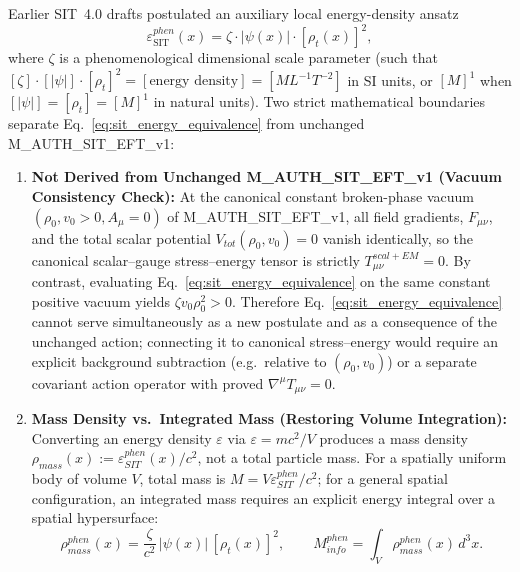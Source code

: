 \documentclass[american,11pt,letterpaper]{article}
\def\mathcal#1{#1}%
\def\mathrm#1{#1}%
\def\texttt#1{#1}%
\def\emph#1{#1}%
\begin{document}
Earlier SIT~4.0 drafts postulated an auxiliary local energy-density ansatz
\begin{equation}
    \varepsilon_{\text{SIT}}^{\mathrm{phen}}(x) = \zeta \cdot |\psi(x)| \cdot [\rho_t(x)]^2,
    \label{eq:sit_energy_equivalence}
\end{equation}
where $\zeta$ is a phenomenological dimensional scale parameter (such that $[\zeta]\cdot[|\psi|]\cdot[\rho_t]^2 = [\text{energy density}] = [M L^{-1} T^{-2}]$ in SI units, or $[M]^1$ when $[|\psi|] = [\rho_t] = [M]^1$ in natural units). Two strict mathematical boundaries separate Eq.~\eqref{eq:sit_energy_equivalence} from unchanged \texttt{M\_AUTH\_SIT\_EFT\_v1}:
\begin{enumerate}[leftmargin=2em]
  \item \textbf{Not Derived from Unchanged \texttt{M\_AUTH\_SIT\_EFT\_v1} (Vacuum Consistency Check):} At the canonical constant broken-phase vacuum $(\rho_0, v_0 > 0, A_\mu = 0)$ of \texttt{M\_AUTH\_SIT\_EFT\_v1}, all field gradients, $F_{\mu\nu}$, and the total scalar potential $V_{\mathrm{tot}}(\rho_0, v_0) = 0$ vanish identically, so the canonical scalar--gauge stress--energy tensor is strictly $T_{\mu\nu}^{\mathrm{scal+EM}} = 0$. By contrast, evaluating Eq.~\eqref{eq:sit_energy_equivalence} on the same constant positive vacuum yields $\zeta v_0 \rho_0^2 > 0$. Therefore Eq.~\eqref{eq:sit_energy_equivalence} cannot serve simultaneously as a new postulate and as a consequence of the unchanged action; connecting it to canonical stress--energy would require an explicit background subtraction (e.g.\ relative to $(\rho_0, v_0)$) or a separate covariant action operator with proved $\nabla^\mu T_{\mu\nu} = 0$.
  \item \textbf{Mass Density vs.\ Integrated Mass (Restoring Volume Integration):} Converting an energy density $\varepsilon$ via $\varepsilon = m c^2 / V$ produces a \emph{mass density} $\rho_{\mathrm{mass}}(x) := \varepsilon_{\mathrm{SIT}}^{\mathrm{phen}}(x)/c^2$, not a total particle mass. For a spatially uniform body of volume $V$, total mass is $M = V \varepsilon_{\mathrm{SIT}}^{\mathrm{phen}} / c^2$; for a general spatial configuration, an integrated mass requires an explicit energy integral over a spatial hypersurface:
  \begin{equation}
      \rho_{\mathrm{mass}}^{\mathrm{phen}}(x) = \frac{\zeta}{c^2}\,|\psi(x)|\,[\rho_t(x)]^2,
      \qquad
      M_{\mathrm{info}}^{\mathrm{phen}} = \int_{\mathcal{V}} \rho_{\mathrm{mass}}^{\mathrm{phen}}(x)\,d^3x.
      \label{eq:mass_from_sit}
  \end{equation}
\end{enumerate}
\end{document}
